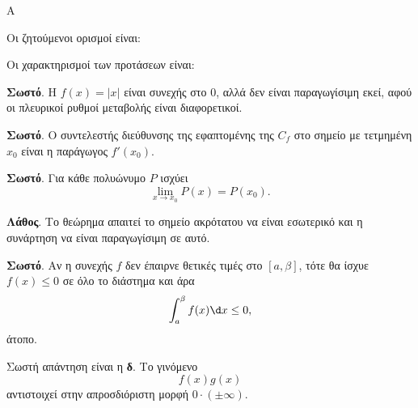 \begin{thema}{Α}
\begin{erwthma}
\item {}

\item {}

\item Οι ζητούμενοι ορισμοί είναι:

\item Οι χαρακτηρισμοί των προτάσεων είναι:
\begin{alist}
\item \textbf{Σωστό}. Η $f(x)=|x|$ είναι συνεχής στο $0$, αλλά δεν είναι παραγωγίσιμη εκεί, αφού οι πλευρικοί ρυθμοί μεταβολής είναι διαφορετικοί.
\item \textbf{Σωστό}. Ο συντελεστής διεύθυνσης της εφαπτομένης της $C_f$ στο σημείο με τετμημένη $x_0$ είναι η παράγωγος $f'(x_0)$.
\item \textbf{Σωστό}. Για κάθε πολυώνυμο $P$ ισχύει
\[ \lim_{x\to x_0}P(x)=P(x_0). \]
\item \textbf{Λάθος}. Το θεώρημα  απαιτεί το σημείο ακρότατου να είναι εσωτερικό και η συνάρτηση να είναι παραγωγίσιμη σε αυτό.
\item \textbf{Σωστό}. Αν η συνεχής $f$ δεν έπαιρνε θετικές τιμές στο $[a,\beta]$, τότε θα ίσχυε $f(x)\leq0$ σε όλο το διάστημα και άρα
\[ \dint_a^\beta f(x)\d x\leq0, \]
άτοπο.
\end{alist}

\item Σωστή απάντηση είναι η \textbf{δ}. Το γινόμενο
\[ f(x)g(x) \]
αντιστοιχεί στην απροσδιόριστη μορφή $0\cdot(\pm\infty)$.
\end{erwthma}
\end{thema}

